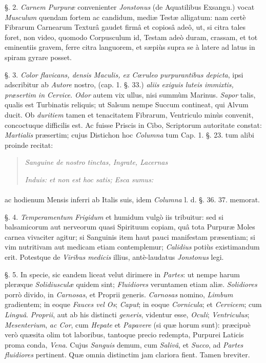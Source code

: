 \documentclass[a4paper, 11pt, oneside, polutonikogreek, german]{article}
\begin{document}
§. 2. \emph{Carnem Purpuræ} convenienter \emph{Jonstonus} (de Aquatilibus Exsangu.) vocat \emph{Musculum} quendam fortem ac candidum, mediæ Testæ alligatum: nam certè Fibrarum Carnearum Texturâ gaudet firmâ et copiosâ adeô, ut, si citra tales foret, non video, quomodo Corpusculum id, Testam adeò duram, crassam, et tot eminentiis gravem, ferre citra languorem, et sæpiùs supra se à latere ad latus in spiram gyrare posset.

§. 3. \emph{Color flavicans, densis Maculis, ex Cœruleo purpurantibus depicta}, ipsi adscribitur ab \emph{Autore} nostro, (cap. 1. §. 33.) \emph{aliis exiguis luteis immixtis, præsertim in Cervice}. \emph{Odor} autem vix ullus, nisi summùm Marinus. \emph{Sapor} talis, qualis est Turbinatis reliquis; ut Salsum nempe Succum contineat, qui Alvum ducit. Ob \emph{duritiem} tamen et tenacitatem Fibrarum, Ventriculo minùs convenit, concoctuque difficilis est. Ac fuisse Priscis in Cibo, Scriptorum autoritate constat: \emph{Martialis} præsertim; cujus Distichon hoc \emph{Columna} tum Cap. 1. §. 23. tum alibi proinde recitat:
\begin{quotation}
\emph{Sanguine de nostro tinctas, Ingrate, Lacernas}

\emph{Induis: et non est hoc satis; Esca sumus:}
\end{quotation}
\paragraph{}
ac hodienum Mensis inferri ab Italis suis, idem \emph{Columna} l. d. §. 36. 37. memorat.

§. 4. \emph{Temperamentum Frigidum} et humidum vulgò iis tribuitur: sed si balsamicorum aut nerveorum quasi Spirituum copiam, quâ tota Purpuræ Moles carnea vivaciter agitur; si Sanguinis item haut pauci manifestam præsentiam; si vim nutritivam aut medicam etiam contemplemur; \emph{Calidius} potiùs existimandum erit. Potestque de \emph{Viribus medicis} illius, antè-laudatus \emph{Jonstonus} legi.

§. 5. In specie, sic eandem liceat velut dirimere in \emph{Partes}: ut nempe harum pleræque \emph{Solidiusculæ} quidem sint; \emph{Fluidiores} veruntamen etiam aliæ. \emph{Solidiores} porrò divido, in \emph{Carnosas}, et Proprii generis. \emph{Carnosas} nomino, \emph{Limbum} gradientem; in eoque \emph{Fauces vel Os}; \emph{Caput}; in eoque \emph{Cornicula}; et \emph{Cervicem}; cum \emph{Linguâ}. \emph{Proprii}, aut ab his distincti \emph{generis}, videntur esse, \emph{Oculi}; \emph{Ventriculus}; \emph{Mesenterium}, \emph{ac Cor}, cum \emph{Hepate} et \emph{Papavere} (si quæ horum sunt): præcipuè verò quæsita olim tot laboribus, tantoque precio redempta, Purpurei Laticis proma conda, \emph{Vena}. Cujus \emph{Sanguis} demum, cum \emph{Salivâ}, et \emph{Succo}, ad \emph{Partes fluidiores} pertinent. Quæ omnia distinctim jam clariora fient. Tamen breviter.
\end{document}
